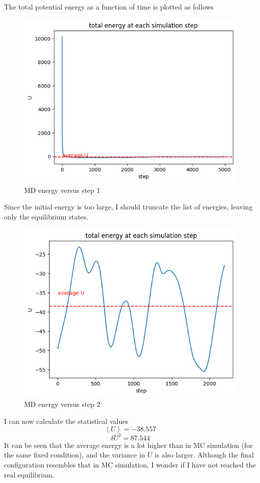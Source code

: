 \documentclass[letterpaper,12pt]{article}
\numberwithin{equation}{section}
\begin{document}
\begin{enumerate}[label=(\alph*)]
    The total potential energy as a function of time is plotted as follows
    \begin{figure}[H]
        \centering
        \includegraphics[width=.8\textwidth]{energy_to_time_md1.png}
        \caption{MD energy versus step 1}
    \end{figure}
    Since the initial energy is too large, I should truncate the list of energies, leaving only the equilibrium states. 
    \begin{figure}[H]
        \centering
        \includegraphics[width=.8\textwidth]{energy_to_time_md2.png}
        \caption{MD energy versus step 2}
    \end{figure}
    I can now calculate the statistical values 
    \begin{equation}
        \left\langle U\right\rangle=-38.557
    \end{equation}
    \begin{equation}
        \delta U^2=87.544
    \end{equation}
    It can be seen that the average energy is a lot higher than in MC simulation (for the same fixed condition), and the variance in $U$ is also larger. Although the final configuration resembles that in MC simulation, I wonder if I have not reached the real equilibrium.
    

\end{enumerate}
\end{document}
